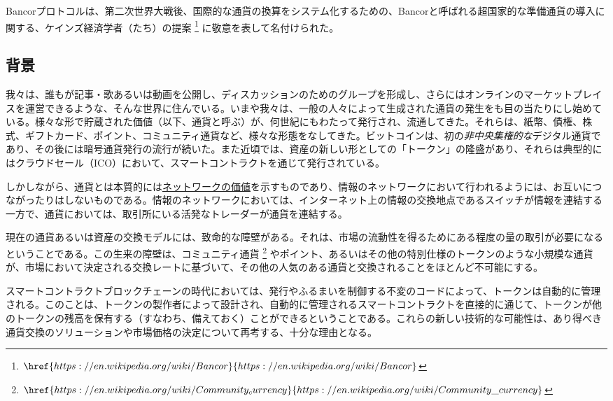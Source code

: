 \documentclass{jsarticle}
\begin{document}
Bancorプロトコルは、第二次世界大戦後、国際的な通貨の換算をシステム化するための、Bancorと呼ばれる超国家的な準備通貨の導入に関する、ケインズ経済学者（たち）の提案
\footnote{
  $\href{
    https://en.wikipedia.org/wiki/Bancor
  }{
    https://en.wikipedia.org/wiki/Bancor
  }$
}
に敬意を表して名付けられた。

  \subsection{背景}

  我々は、誰もが記事・歌あるいは動画を公開し、ディスカッションのためのグループを形成し、さらにはオンラインのマーケットプレイスを運営できるような、そんな世界に住んでいる。いまや我々は、一般の人々によって生成された通貨の発生をも目の当たりにし始めている。様々な形で貯蔵された価値（以下、通貨と呼ぶ）が、何世紀にもわたって発行され、流通してきた。それらは、紙幣、債権、株式、ギフトカード、ポイント、コミュニティ通貨など、様々な形態をなしてきた。ビットコインは、初の\emph{非中央集権的な}デジタル通貨であり、その後には暗号通貨発行の流行が続いた。また近頃では、資産の新しい形としての「トークン」の隆盛があり、それらは典型的にはクラウドセール（ICO）において、スマートコントラクトを通じて発行されている。

  しかしながら、通貨とは本質的には\href{https://blog.bancor.network/coins-are-networks-and-crowdsales-are-their-killer-app-a6ebc16bef31}{ネットワークの価値}を示すものであり、情報のネットワークにおいて行われるようには、お互いにつながったりはしないものである。情報のネットワークにおいては、インターネット上の情報の交換地点であるスイッチが情報を連結する一方で、通貨においては、取引所にいる活発なトレーダーが通貨を連結する。
  
  現在の通貨あるいは資産の交換モデルには、致命的な障壁がある。それは、市場の流動性を得るためにある程度の量の取引が必要になるということである。この生来の障壁は、コミュニティ通貨
  \footnote{
    $\href{
      https://en.wikipedia.org/wiki/Community_currency
    }{
      https://en.wikipedia.org/wiki/Community\_currency
    }$
  } 
  やポイント、あるいはその他の特別仕様のトークンのような小規模な通貨が、市場において決定される交換レートに基づいて、その他の人気のある通貨と交換されることをほとんど不可能にする。

  スマートコントラクトブロックチェーンの時代においては、発行やふるまいを制御する不変のコードによって、トークンは自動的に管理される。このことは、トークンの製作者によって設計され、自動的に管理されるスマートコントラクトを直接的に通じて、トークンが他のトークンの残高を保有する（すなわち、備えておく）ことができるということである。これらの新しい技術的な可能性は、あり得べき通貨交換のソリューションや市場価格の決定について再考する、十分な理由となる。
\end{document}
